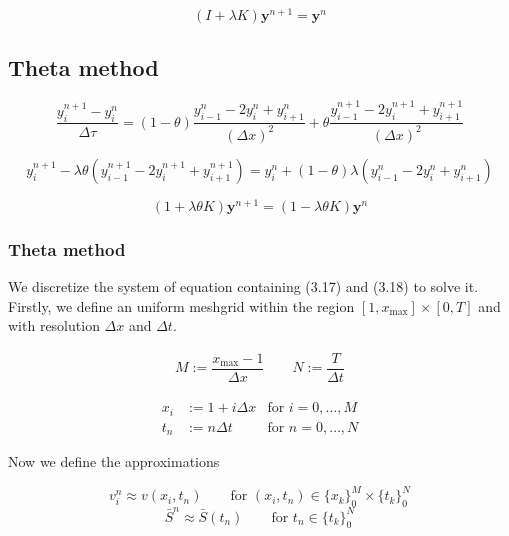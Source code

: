 \begin{equation}
  (I + \lambda K)\boldsymbol{y}^{n+1} = \boldsymbol{y}^{n}
\end{equation}

\subsection{Theta method}

\begin{equation}
  \dfrac{y^{n+1}_{i} - y^{n}_{i}}{\Delta \tau} = (1-\theta)\dfrac{y^{n}_{i-1} - 2y^{n}_{i} + y^{n}_{i+1}}{(\Delta x)^2} +  \theta\dfrac{y^{n+1}_{i-1} - 2y^{n+1}_{i} + y^{n+1}_{i+1}}{(\Delta x)^2}
\end{equation}

\begin{equation}
  y^{n+1}_{i} - \lambda\theta(y^{n+1}_{i-1} - 2y^{n+1}_{i} + y^{n+1}_{i+1}) =  y^{n}_{i} + (1-\theta)\lambda(y^{n}_{i-1} - 2y^{n}_{i} + y^{n}_{i+1})
\end{equation}

\begin{equation}
  (1 + \lambda\theta K)\boldsymbol{y}^{n+1} = (1-\lambda\theta K)\boldsymbol{y}^{n} 
\end{equation}

\subsubsection{Theta method}

We discretize the system of equation containing (3.17) and (3.18) to solve it. 
Firstly, we define an uniform meshgrid within the region $[1, x_\text{max}]\times [0, T]$ and 
with resolution $\Delta x$ and $\Delta t$.

\begin{align*}
    M := \dfrac{x_{\text{max}} - 1}{\Delta x}
    \qquad
    N := \dfrac{T}{\Delta t}
\end{align*}

\begin{align*}
   & & x_i &:= 1 + i{\Delta x} &\text{for $i = 0,\dots,M$} & & \\ 
   & & t_n &:= n{\Delta t} &\text{for $n = 0,\dots,N$} & &
\end{align*}

Now we define the approximations

\begin{equation}
    v^{n}_{i} \approx v(x_{i}, t_{n}) \qquad \text{for $(x_{i}, t_{n}) \in \{x_k\}^{M}_{0} \times \{t_k\}^{N}_{0}$} 
\end{equation}
\begin{equation}
    \bar{S}^{n} \approx \bar{S}(t_{n}) \qquad \text{for $t_{n} \in \{t_k\}^{N}_{0}$} 
\end{equation}

